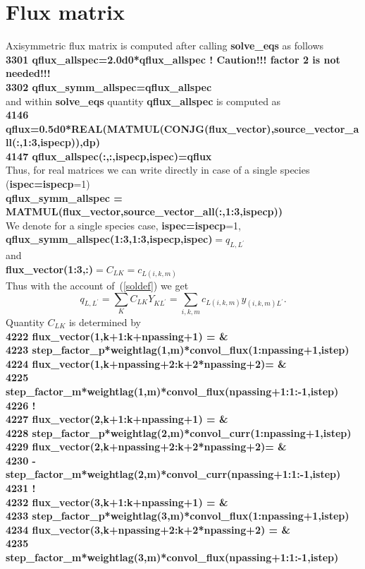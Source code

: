 \documentclass[preprint,prb,aps]{revtex4-1}
\newcommand{\be}[1]{\begin{equation} \label{#1}}
\newcommand{\ee}{\end{equation}}
\newcommand{\eq}[1]{(\ref{#1})}
\begin{document}
\section{Flux matrix}
Axisymmetric flux matrix is computed after calling {\bf solve\_eqs} as follows
\\
{\bf
3301        qflux\_allspec=2.0d0*qflux\_allspec ! Caution!!! factor 2 is not needed!!! \\
3302        qflux\_symm\_allspec=qflux\_allspec
}
\\
and within {\bf solve\_eqs} quantity {\bf qflux\_allspec} is computed as
\\
{\bf
4146       qflux=0.5d0*REAL(MATMUL(CONJG(flux\_vector),source\_vector\_all(:,1:3,ispecp)),dp) \\
4147       qflux\_allspec(:,:,ispecp,ispec)=qflux
}
\\
Thus, for real matrices we can write directly in case of a single species ({\bf ispec=ispecp}=1)
\\
{\bf
qflux\_symm\_allspec = MATMUL(flux\_vector,source\_vector\_all(:,1:3,ispecp))
}
\\
We denote for a single species case, {\bf ispec=ispecp}=1,
\\
{\bf qflux\_symm\_allspec(1:3,1:3,ispecp,ispec)}$=q_{L,L^\prime}$
\\
and
\\
{\bf flux\_vector(1:3,:)}$=C_{LK}=c_{L(i,k,m)}$
\\
Thus with the account of~\eq{soldef} we get
\be{gendef_qflux}
q_{L,L^\prime} = \sum_K C_{LK} Y_{KL^\prime}=\sum_{i,k,m} c_{L(i,k,m)} y_{(i,k,m)L^\prime}.
\ee
Quantity $C_{LK}$ is determined by
\\
{\bf
4222         flux\_vector(1,k+1:k+npassing+1) =                                     \& \\
4223               step\_factor\_p*weightlag(1,m)*convol\_flux(1:npassing+1,istep) \\
4224         flux\_vector(1,k+npassing+2:k+2*npassing+2)=                           \& \\
4225               step\_factor\_m*weightlag(1,m)*convol\_flux(npassing+1:1:-1,istep) \\
4226 ! \\
4227         flux\_vector(2,k+1:k+npassing+1) =                                     \& \\
4228               step\_factor\_p*weightlag(2,m)*convol\_curr(1:npassing+1,istep) \\
4229         flux\_vector(2,k+npassing+2:k+2*npassing+2)=                           \& \\
4230              -step\_factor\_m*weightlag(2,m)*convol\_curr(npassing+1:1:-1,istep) \\
4231 ! \\
4232         flux\_vector(3,k+1:k+npassing+1) =                                     \& \\
4233               step\_factor\_p*weightlag(3,m)*convol\_flux(1:npassing+1,istep) \\
4234         flux\_vector(3,k+npassing+2:k+2*npassing+2) =                          \& \\
4235               step\_factor\_m*weightlag(3,m)*convol\_flux(npassing+1:1:-1,istep) \\
}
\end{document}
